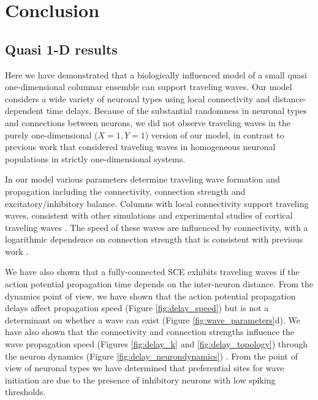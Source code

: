 
\chapter{Conclusion}

\section{Quasi 1-D results}
Here we have demonstrated that a biologically influenced model of a small quasi one-dimensional columnar ensemble  can support traveling waves. 
Our model considers a wide variety of neuronal types using local connectivity and distance-dependent time delays.
Because of the substantial randomness in neuronal types and connections between neurons, we did not observe traveling waves in the purely one-dimensional ($X=1,Y=1$) version of our model, 
in contrast to previous work that considered traveling waves in homogeneous neuronal populations in strictly one-dimensional systems. 

In our model various parameters determine traveling wave formation and propagation including the connectivity, connection strength and excitatory/inhibitory balance.
Columns with local connectivity support traveling waves, consistent with other simulations and experimental studies of cortical traveling waves \citep{Kopell1986}\citep{ermentrout2001}\citep{Golomb1999} .
The speed of these waves are influenced by connectivity, with a logarithmic dependence on connection strength that is consistent with previous work \citep{Golomb1996}\citep{Golomb1999}.

We have also shown that  a fully-connected SCE exhibits traveling waves if the action potential propagation time depends on the inter-neuron distance. 
From the dynamics point of view, we have shown that the action potential propagation delays affect propagation speed (Figure \ref{fig:delay_speed}) but is not a determinant on whether a wave can exist 
(Figure \ref{fig:wave_parameters}d).
We have also shown that  the connectivity and connection strengths influence the wave propagation speed (Figures \ref{fig:delay_k} and \ref{fig:delay_topology}) 
through the neuron dynamics (Figure \ref{fig:delay_neurondynamics}) .
From the point of view of neuronal types  we have determined that preferential sites for wave initiation are due to the presence of inhibitory neurons with low spiking thresholds.

